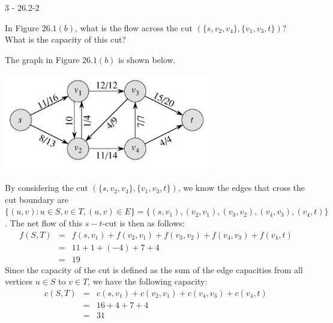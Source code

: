 \documentclass[11pt]{article}
\begin{document}
\begin{prob}{3 - 26.2-2}

In Figure $26.1(b)$, what is the flow across the cut $(\{s, v_2, v_4\}, \{v_1, v_3, t\})$? What is the capacity of this cut?
\end{prob}
\begin{sol}
The graph in Figure $26.1(b)$ is shown below.

\begin{center}
	\includegraphics[width=90mm]{graphpic.png}
\end{center}

By considering the cut $(\{s, v_2, v_4\}, \{v_1, v_3, t\})$, we know the edges that cross the cut boundary are $\{(u,v) : u \in S, v \in T, (u,v) \in E\} = \{(s, v_1), (v_2, v_1), (v_3, v_2), (v_4, v_3), (v_4, t)\}$. The net flow of this $s-t$-cut is then as follows:
\begin{eqnarray*}
f(S, T) & = & f(s, v_1) + f(v_2, v_1) + f(v_3, v_2) + f(v_4, v_3) + f(v_4, t) \\
& = & 11 + 1 + (-4) + 7 + 4 \\
& = & 19
\end{eqnarray*}
Since the capacity of the cut is defined as the sum of the edge capacities from all vertices $u \in S$ to $v \in T$, we have the following capacity:
\begin{eqnarray*}
c(S, T) & = & c(s,v_1) + c(v_2, v_1) + c(v_4, v_3) + c(v_4, t) \\
& = & 16 + 4 + 7 + 4 \\
& = & 31
\end{eqnarray*}

\end{sol}
\end{document}

